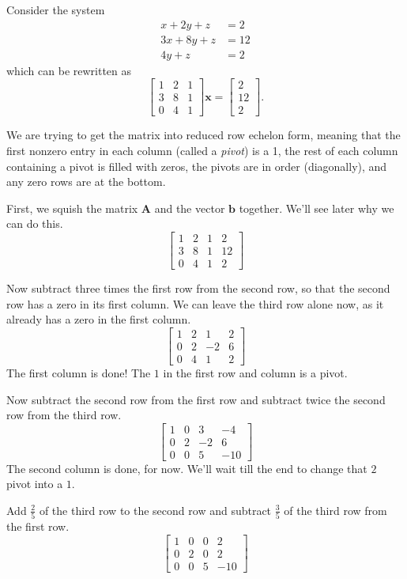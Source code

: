 \documentclass[10pt,letterpaper,twocolumn]{article}
\newcommand{\matr}[1]{\mathbf{#1}}
\begin{document}
Consider the system
\begin{align*}
	x + 2y + z &= 2\\
	3x + 8y + z &= 12\\
	4y + z &= 2
\end{align*}
which can be rewritten as 
$$
\begin{bmatrix}
1 & 2 & 1 \\ 
3 & 8 & 1 \\ 
0 & 4 & 1
\end{bmatrix} 
\matr{x} = 
\begin{bmatrix}
2 \\ 
12 \\ 
2
\end{bmatrix}. 
$$

We are trying to get the matrix into reduced row echelon form, meaning that the first nonzero entry in each column (called a \textit{pivot}) is a 1, the rest of each column containing a pivot is filled with zeros, the pivots are in order (diagonally), and any zero rows are at the bottom.

First, we squish the matrix $\matr{A}$ and the vector $\matr{b}$ together. We'll see later why we can do this.
$$
\begin{bmatrix}
1 & 2 & 1 & 2 \\ 
3 & 8 & 1 & 12 \\ 
0 & 4 & 1 & 2
\end{bmatrix}
$$

Now subtract three times the first row from the second row, so that the second row has a zero in its first column. We can leave the third row alone now, as it already has a zero in the first column.
$$
\begin{bmatrix}
1 & 2 & 1 & 2 \\
0 & 2 & -2 & 6 \\
0 & 4 & 1 & 2
\end{bmatrix}
$$
The first column is done! The $1$ in the first row and column is a pivot. 

Now subtract the second row from the first row and subtract twice the second row from the third row. 
$$
\begin{bmatrix}
1 & 0 & 3 & -4 \\
0 & 2 & -2 & 6 \\
0 & 0 & 5 & -10
\end{bmatrix}
$$
The second column is done, for now. We'll wait till the end to change that $2$ pivot into a $1$.

Add $\frac{2}{5}$ of the third row to the second row and subtract $\frac{3}{5}$ of the third row from the first row.
$$
\begin{bmatrix}
1 & 0 & 0 & 2 \\
0 & 2 & 0 & 2 \\
0 & 0 & 5 & -10
\end{bmatrix}
$$
\end{document}
